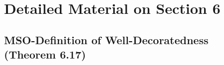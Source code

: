 \documentclass[10pt,a4paper]{amsart}
\theoremstyle{definition}
\numberwithin{equation}{section}
\theoremstyle{plain}
\theoremstyle{definition}
\theoremstyle{myexample}
\theoremstyle{plain}
\theoremstyle{definition}
\begin{document}





\section{Detailed Material on Section 6}\label{app:section-3-proofs}


\subsection{MSO-Definition of Well-Decoratedness (Theorem 6.17)}
\end{document}
